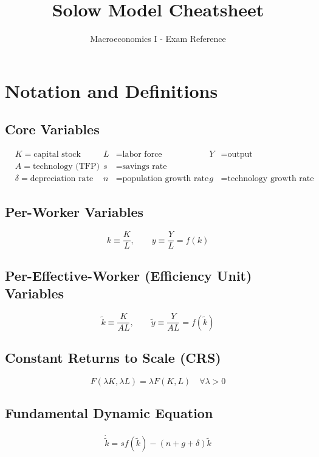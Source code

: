 \documentclass[a4paper,11pt]{article}
\title{\textbf{Solow Model Cheatsheet}}
\author{Macroeconomics I - Exam Reference}
\date{}
\newcommand{\ktilde}{\tilde{k}}
\newcommand{\ytilde}{\tilde{y}}
\begin{document}
\maketitle


\tableofcontents

\clearpage
\pagestyle{plain}

\section{Notation and Definitions}

\subsection*{Core Variables}
\begin{align*}
& K = \text{capital stock} & L &= \text{labor force} & Y &= \text{output} \\
& A = \text{technology (TFP)} & s &= \text{savings rate} \\
& \delta = \text{depreciation rate} & n &= \text{population growth rate} & g &= \text{technology growth rate}
\end{align*}

\medskip
\subsection*{Per-Worker Variables}
\[
k \equiv \frac{K}{L}, \qquad y \equiv \frac{Y}{L} = f(k)
\]

\medskip
\subsection*{Per-Effective-Worker (Efficiency Unit) Variables}
\[
\ktilde \equiv \frac{K}{AL}, \qquad \ytilde \equiv \frac{Y}{AL} = f(\ktilde)
\]

\medskip
\subsection*{Constant Returns to Scale (CRS)}
\[
F(\lambda K, \lambda L) = \lambda F(K, L) \quad \forall \lambda > 0
\]

\medskip
\subsection*{Fundamental Dynamic Equation}
\begin{align*}
\dot{\ktilde} = s f(\ktilde) - (n + g + \delta) \ktilde
\tag{Dynamic Equation}
\end{align*}
\end{document}
